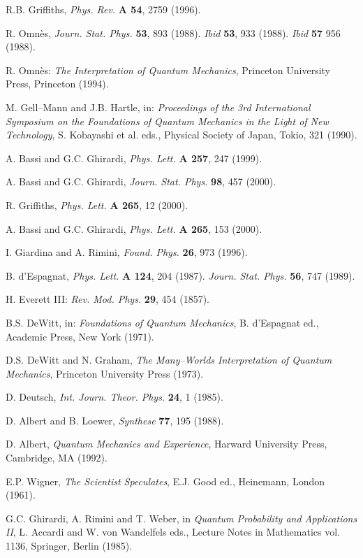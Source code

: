 \documentclass[10pt,a4paper]{article}
\begin{document}
\begin{thebibliography}{999}
 R.B. Griffiths, {\it Phys. Rev.} {\bf A 54}, 2759
(1996).

 R. Omn\`es, {\it Journ. Stat. Phys.} {\bf 53}, 893
(1988). {\it Ibid} {\bf 53}, 933 (1988). {\it Ibid} {\bf 57} 956
(1988).

 R. Omn\`es: {\it The Interpretation of Quantum
Mechanics}, Princeton University Press, Princeton (1994).

 M. Gell--Mann and J.B. Hartle, in: {\it Proceedings
of the 3rd International Symposium on the Foundations of Quantum
Mechanics in the Light of New Technology}, S. Kobayashi et al.
eds., Physical Society of Japan, Tokio, 321 (1990).

 A. Bassi and G.C. Ghirardi, {\it Phys. Lett.} {\bf A
257}, 247 (1999).

 A. Bassi and G.C. Ghirardi, {\it Journ. Stat. Phys.}
{\bf 98}, 457 (2000).

 R. Griffiths, {\it Phys. Lett.} {\bf A 265}, 12
(2000).

 A. Bassi and G.C. Ghirardi, {\it Phys. Lett.} {\bf
A 265}, 153 (2000).

 I. Giardina and A. Rimini, {\it Found. Phys.}
{\bf 26}, 973 (1996).

 B. d'Espagnat, {\it Phys. Lett.} {\bf A 124}, 204
(1987). {\it Journ. Stat. Phys.} {\bf 56}, 747 (1989).

 H. Everett III: {\it Rev. Mod. Phys.} {\bf 29}, 454
(1857).

 B.S. DeWitt, in: {\it Foundations of Quantum
Mechanics}, B. d'Espagnat ed., Academic Press, New York (1971).

 D.S. DeWitt and N. Graham, {\it The Many--Worlds
Interpretation of Quantum Mechanics}, Princeton University Press
(1973).

 D. Deutsch, {\it Int. Journ. Theor. Phys.} {\bf 24},
1 (1985).

 D. Albert and B. Loewer, {\it Synthese} {\bf 77},
195 (1988).

 D. Albert, {\it Quantum Mechanics and Experience},
Harward University Press, Cambridge, MA (1992).

 E.P. Wigner, {\it The Scientist Speculates}, E.J.
Good ed., Heinemann, London (1961).

 G.C. Ghirardi, A. Rimini and T. Weber, in {\it Quantum
Probability and Applications II}, L. Accardi and W. von Wandelfels eds.,
Lecture Notes in Mathematics vol. 1136, Springer, Berlin (1985).


\end{thebibliography}
\end{document}
